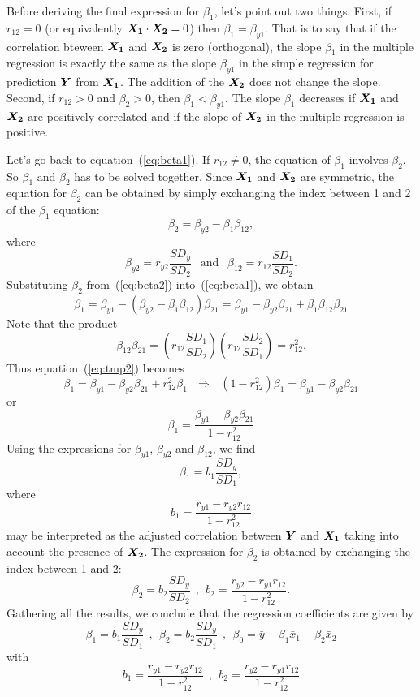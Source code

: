 \documentclass[11pt]{article}
\newcommand{\beq}{\begin{equation}}
\newcommand{\eeq}{\end{equation}}
\newcommand{\ve}[1]{\mbox{\boldmath $#1$}}
\begin{document}
Before deriving the final expression for $\beta_1$, let's point out two things. First, 
if $r_{12}=0$ (or equivalently $\ve{X_1}\cdot \ve{X_2}=0$) then $\beta_1=\beta_{y1}$. 
That is to say that if the correlation bteween $\ve{X_1}$ and $\ve{X_2}$ is zero (orthogonal), 
the slope $\beta_1$ in the multiple regression is exactly the same as the slope 
$\beta_{y1}$ in the simple regression for prediction $\ve{Y}$ from $\ve{X_1}$. The 
addition of the $\ve{X_2}$ does not change the slope. Second, if $r_{12}>0$ and 
$\beta_2>0$, then $\beta_1 < \beta_{y1}$. The slope $\beta_1$ decreases if 
$\ve{X_1}$ and $\ve{X_2}$ are positively correlated and if the slope of $\ve{X_2}$ 
in the multiple regression is positive. 

Let's go back to equation~(\ref{eq:beta1}). If $r_{12} \neq0$, the equation of 
$\beta_1$ involves $\beta_2$. So $\beta_1$ and $\beta_2$ has to be solved 
together. Since $\ve{X_1}$ and $\ve{X_2}$ are symmetric, the equation for 
$\beta_2$ can be obtained by simply exchanging the index between 1 and 2 of 
the $\beta_1$ equation: 
\beq
  \beta_2 = \beta_{y2} - \beta_1 \beta_{12} ,
\label{eq:beta2}
\eeq
where 
\beq
  \beta_{y2} = r_{y2} \frac{SD_y}{SD_2} \ \ \mbox{ and } \ \ \beta_{12} = r_{12} \frac{SD_1}{SD_2} .
\eeq
Substituting $\beta_2$ from~(\ref{eq:beta2}) into~(\ref{eq:beta1}), we obtain 
\beq
  \beta_1 = \beta_{y1} - (\beta_{y2} - \beta_1 \beta_{12}) \beta_{21} 
= \beta_{y1} - \beta_{y2} \beta_{21} + \beta_1 \beta_{12} \beta_{21} 
\label{eq:tmp2}
\eeq
Note that the product 
\[
  \beta_{12} \beta_{21} = \left( r_{12} \frac{SD_1}{SD_2}\right) \left( r_{12}\frac{SD_2}{SD_1}\right) 
= r_{12}^2 .
\]
Thus equation~(\ref{eq:tmp2}) becomes 
\[
  \beta_1 = \beta_{y1} - \beta_{y2} \beta_{21} + r_{12}^2 \beta_1 \ \ \ \Rightarrow \ \ \
  (1-r_{12}^2) \beta_1 = \beta_{y1} - \beta_{y2} \beta_{21} 
\]
or 
\[
  \beta_1 = \frac{\beta_{y1} - \beta_{y2} \beta_{21}}{1-r_{12}^2} 
\]
Using the expressions for $\beta_{y1}$, $\beta_{y2}$ and $\beta_{12}$, we find 
\beq
  \beta_1 = b_1 \frac{SD_y}{SD_1} , 
\label{eq:beta1_2vars}
\eeq
where 
\[
  b_1 = \frac{r_{y1}-r_{y2} r_{12}}{1-r_{12}^2} 
\]
may be interpreted as the adjusted correlation between $\ve{Y}$ and $\ve{X_1}$ 
taking into account the presence of $\ve{X_2}$.
The expression for $\beta_2$ is obtained by exchanging 
the index between 1 and 2: 
\[
  \beta_2 = b_2 \frac{SD_y}{SD_2} \ \ , \ \ b_2 = \frac{r_{y2}-r_{y1} r_{12}}{1-r_{12}^2} .
\]
Gathering all the results, we conclude that the regression coefficients are given by 
\beq
  \boxed{ \beta_1 = b_1 \frac{SD_y}{SD_1} \ \ , \ \ \beta_2=b_2 \frac{SD_y}{SD_1} \ \ , \ \ 
  \beta_0 = \bar{y}-\beta_1 \bar{x}_1 - \beta_2 \bar{x}_2 }
\label{eq:regcoefs2vras}
\eeq
with 
\beq
  \boxed{ b_1 = \frac{r_{y1}-r_{y2} r_{12}}{1-r_{12}^2} \ \ , \ \ 
  b_2 = \frac{r_{y2}-r_{y1} r_{12}}{1-r_{12}^2} }
\label{eq:b1b2}
\eeq
\end{document}
